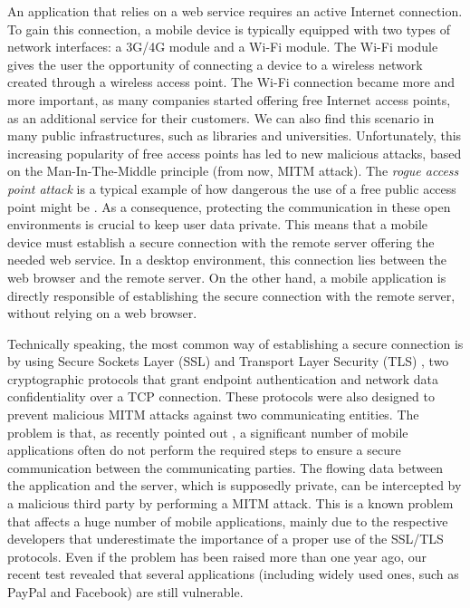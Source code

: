\documentclass[english]{llncs}
\begin{document}
An application that relies on a web service requires an active Internet connection. To gain this connection, a mobile device is typically equipped with two types of network interfaces: a 3G/4G module and a Wi-Fi module. The Wi-Fi module gives the user the opportunity of connecting a device to a wireless network created through a wireless access point. The Wi-Fi connection became more and more important, as many companies started offering free Internet access points, as an additional service for their customers. We can also find this scenario in many public infrastructures, such as libraries and universities. Unfortunately, this increasing popularity of free access points has led to new malicious attacks, based on the Man-In-The-Middle principle (from now, MITM attack). The \textit{rogue access point attack} is a typical example of how dangerous the use of a free public access point might be \cite{4455018}. As a consequence, protecting the communication in these open environments is crucial to keep user data private. This means that a mobile device must establish a secure connection with the remote server offering the needed web service. In a desktop environment, this connection lies between the web browser and the remote server. On the other hand, a mobile application is directly responsible of establishing the secure connection with the remote server, without relying on a web browser. 

Technically speaking, the most common way of establishing a secure connection is by using Secure Sockets Layer (SSL) \cite{ssl_rfc} and Transport Layer Security (TLS) \cite{tls_rfc}, two cryptographic protocols that grant endpoint authentication and network data confidentiality over a TCP connection. These protocols were also designed to prevent malicious MITM attacks against two communicating entities. The problem is that, as recently pointed out \cite{Fahl:2012:WEM:2382196.2382205}, a significant number of mobile applications often do not perform the required steps to ensure a secure communication between the communicating parties. The flowing data between the application and the server, which is supposedly private, can be intercepted by a malicious third party by performing a MITM attack. This is a known problem that affects a huge number of mobile applications, mainly due to the respective developers that underestimate the importance of a proper use of the SSL/TLS protocols. Even if the problem has been raised more than one year ago, our recent test revealed that several applications (including widely used ones, such as PayPal and Facebook) are still vulnerable. 
\end{document}
